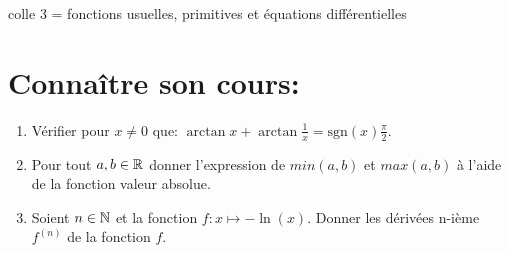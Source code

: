 \documentclass[a4paper,11pt]{article}
\theoremstyle{definition}
\begin{document}
	
	
	\begin{center}
		\Large \sc colle 3 = fonctions usuelles, primitives et équations différentielles 
	\end{center}

\section*{Connaître son cours:}
\begin{enumerate}
	\item Vérifier pour $x\neq0$ que: $\arctan x + \arctan\frac{1}{x} = \text{sgn}(x)\frac{\pi}{2}.$
	\item Pour tout $a,b\in \mathbb{R}$ donner l'expression de $min(a,b)$ et $max(a,b)$ à l'aide de la fonction valeur absolue. 
	\item  Soient $n\in\mathbb{N}$ et la fonction $f:x\mapsto-\ln(x)$. Donner les dérivées  n-ième  $f^{(n)}$ de la fonction $f$.
\end{enumerate}
\end{document}
